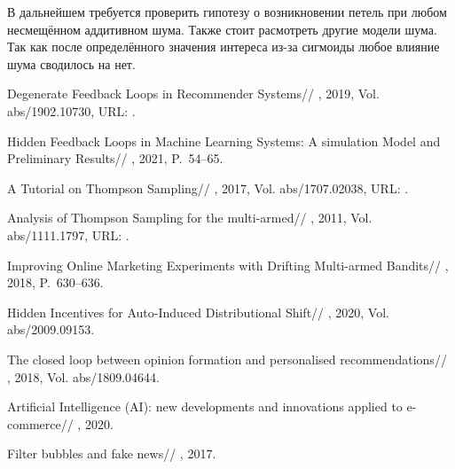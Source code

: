 \documentclass[12pt, twoside]{article}
\begin{document}
В дальнейшем требуется проверить гипотезу о возникновении петель при любом несмещённом аддитивном шума. 
Также стоит расмотреть другие модели шума. 
Так как после определённого значения интереса из-за сигмоиды любое влияние шума сводилось на нет. 
\begin{thebibliography}{99}
    Degenerate Feedback Loops in Recommender Systems//
    , 2019, Vol. abs/1902.10730,
	  URL: .

    Hidden Feedback Loops in Machine Learning Systems: A simulation Model and Preliminary Results//
    , 2021, P.~54--65.

    A Tutorial on Thompson Sampling//
    , 2017, Vol. abs/1707.02038,
	  URL: .

    Analysis of Thompson Sampling for the multi-armed//
    , 2011, Vol. abs/1111.1797,
	  URL: .

    Improving Online Marketing Experiments with Drifting Multi-armed Bandits//
    , 2018, P.~630--636.

    Hidden Incentives for Auto-Induced Distributional Shift//
    , 2020, Vol. abs/2009.09153.

    The closed loop between opinion formation and personalised recommendations//
    , 2018, Vol. abs/1809.04644.

    Artificial Intelligence (AI): new developments and innovations applied to e-commerce//
    , 2020.

    Filter bubbles and fake news//
    , 2017.
\end{thebibliography}

\end{document}

